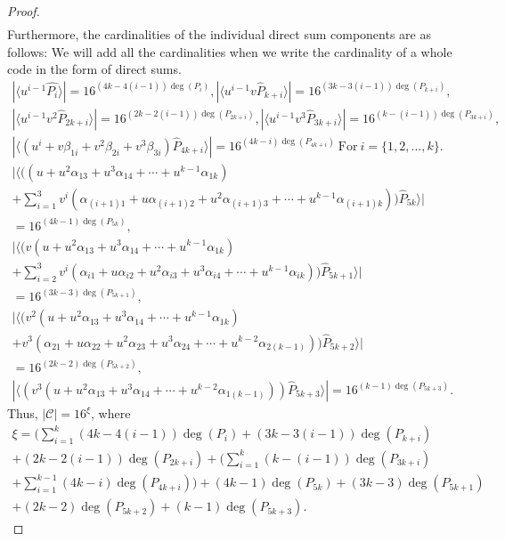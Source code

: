 \documentclass{amsart}
\theoremstyle{definition}
\theoremstyle{remark}
\numberwithin{equation}{section}
\begin{document}
\begin{proof}
\begin{gather*}
		\end{gather*}
Furthermore, the cardinalities of the individual direct sum components are as follows: We will add all the cardinalities when we write the cardinality of a whole code in the form of direct sums. 
\begin{gather*}
    |\langle u^{i-1}\hat{P_i}\rangle|={16}^{(4k-4(i-1))\deg(P_i)},
    |\langle u^{i-1}v\hat{P}_{k+i}\rangle|={16}^{(3k-3(i-1))\deg(P_{k+i})}, \\
    |\langle u^{i-1}v^2\hat{P}_{2k+i}\rangle|={16}^{(2k-2(i-1))\deg(P_{2k+i})},
    |\langle u^{i-1}v^3\hat{P}_{3k+i}\rangle|={16}^{(k-(i-1))\deg(P_{3k+i})}, \\
    |\langle (u^i+ v\beta_{1i} + v^2\beta_{2i} + v^3\beta_{3i})\hat{P}_{4k+i}\rangle| = {16}^{(4k-i)\deg(P_{4k+i})} ~ \text{For} ~ i = \{1,2,\dots,k\}. \\
    |\langle((u + u^2\alpha_{13} + u^3\alpha_{14} + \cdots + u^{k-1}\alpha_{1k})
     \\ + \sum_{i=1}^{3} v^i( \alpha_{(i+1)1} + u\alpha_{(i+1)2} + u^2\alpha_{(i+1)3} +  \cdots + u^{k-1}\alpha_{(i+1)k} ))\hat{P}_{5k}\rangle |\\ ={16}^{(4k-1)\deg(P_{5k})}, \\
     | \langle (v(u + u^2\alpha_{13} + u^3\alpha_{14} + \cdots + u^{k-1}\alpha_{1k})
     \\  + \sum_{i=2}^{3} v^i( \alpha_{i1} + u\alpha_{i2} + u^2\alpha_{i3} + u^3\alpha_{i4} + \cdots + u^{k-1}\alpha_{ik} ))\hat{P}_{5k+1} \rangle | \\ ={16}^{(3k-3)\deg(P_{5k+1})}, \\
      |\langle (v^2(u + u^2\alpha_{13} + u^3\alpha_{14} + \cdots + u^{k-1}\alpha_{1k})\\
      + v^3( \alpha_{21} + u\alpha_{22} + u^2\alpha_{23} + u^3\alpha_{24} + \cdots + u^{k-2}\alpha_{2(k-1)}))\hat{P}_{5k+2}\rangle| \\ ={16}^{(2k-2)\deg(P_{5k+2})}, \\
      | \langle (v^3(u + u^2\alpha_{13} + u^3\alpha_{14} + \cdots + u^{k-2}\alpha_{1(k-1)}))\hat{P}_{5k+3}\rangle| = {16}^{(k-1)\deg(P_{5k+3})}.
     \end{gather*}
Thus, $|\mathcal{C}|=16^{\xi}$, where
    \begin{gather*}
    \xi = ( \sum_{i=1}^{k} (4k-4(i-1))\deg(P_i) + (3k-3(i-1))\deg(P_{k+i})  \\
     + (2k-2(i-1))\deg(P_{2k+i})  + ( \sum_{i=1}^{k} (k-(i-1))\deg(P_{3k+i})
    \\ + \sum_{i=1}^{k-1}(4k-i)\deg(P_{4k+i}) )
    + (4k-1)\deg(P_{5k}) + (3k-3)\deg(P_{5k+1}) \\ + (2k-2)\deg(P_{5k+2}) + (k-1)\deg(P_{5k+3}).\end{gather*}
      \end{proof}
\end{document}
